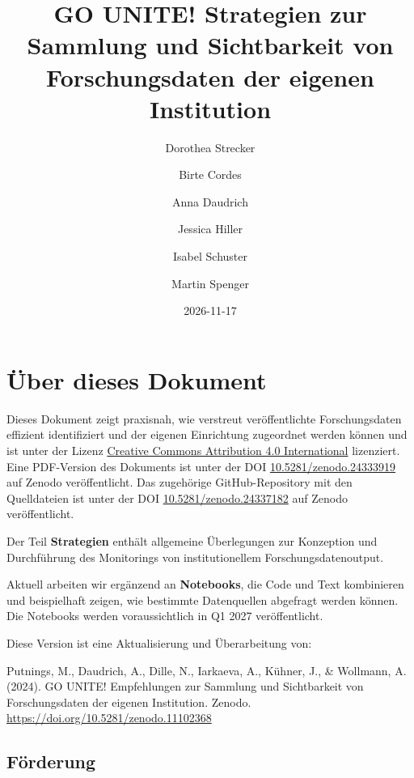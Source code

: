 \documentclass[
  ngerman,
  letterpaper,
  DIV=11]{scrreprt}
\title{GO UNITE! Strategien zur Sammlung und Sichtbarkeit von
Forschungsdaten der eigenen Institution}
\author{Dorothea Strecker \and Birte Cordes \and Anna
Daudrich \and Jessica Hiller \and Isabel Schuster \and Martin Spenger}
\date{2026-11-17}
\renewcommand*\contentsname{Inhaltsverzeichnis}
\newcommand\contentsname{Inhaltsverzeichnis}
\begin{document}
\maketitle

\renewcommand*\contentsname{Inhaltsverzeichnis}
{
\setcounter{tocdepth}{2}
\tableofcontents
}


\chapter*{Über dieses Dokument}\label{uxfcber-dieses-dokument}


Dieses Dokument zeigt praxisnah, wie verstreut veröffentlichte
Forschungsdaten effizient identifiziert und der eigenen Einrichtung
zugeordnet werden können und ist unter der Lizenz
\href{https://creativecommons.org/licenses/by/4.0/deed.en}{Creative
Commons Attribution 4.0 International} lizenziert. Eine PDF-Version des
Dokuments ist unter der DOI
\href{https://doi.org/10.5281/zenodo.24333919}{10.5281/zenodo.24333919}
auf Zenodo veröffentlicht. Das zugehörige GitHub-Repository mit den Quelldateien ist unter der DOI \href{https://doi.org/10.5281/zenodo.24337182}{10.5281/zenodo.24337182} auf Zenodo veröffentlicht. 

Der Teil \textbf{Strategien} enthält allgemeine Überlegungen zur
Konzeption und Durchführung des Monitorings von institutionellem
Forschungsdatenoutput.

Aktuell arbeiten wir ergänzend an \textbf{Notebooks}, die Code und Text
kombinieren und beispielhaft zeigen, wie bestimmte Datenquellen
abgefragt werden können. Die Notebooks werden voraussichtlich in Q1 2027
veröffentlicht.

Diese Version ist eine Aktualisierung und Überarbeitung von:

Putnings, M., Daudrich, A., Dille, N., Iarkaeva, A., Kühner, J., \&
Wollmann, A. (2024). GO UNITE! Empfehlungen zur Sammlung und
Sichtbarkeit von Forschungsdaten der eigenen Institution. Zenodo.
\url{https://doi.org/10.5281/zenodo.11102368}

\section*{Förderung}\label{fuxf6rderung}
\end{document}
